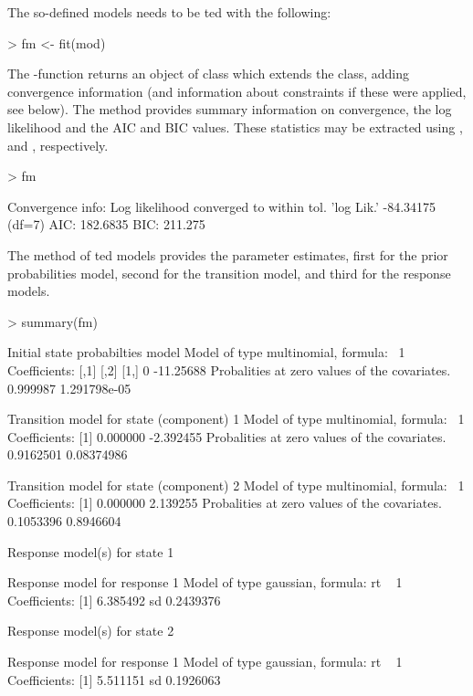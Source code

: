 \documentclass[article]{jss}
\begin{document}
The so-defined models needs to be ted with the following: 
\begin{CodeChunk}
\begin{CodeInput}
> fm <- fit(mod)
\end{CodeInput}
\end{CodeChunk}

The -function returns an object of class
 which extends the  class, adding
convergence information (and information about constraints if these
were applied, see below).  The  method provides summary
information on convergence, the log likelihood and the AIC and BIC
values.  These statistics may be extracted using ,
 and , respectively.

\begin{CodeChunk}
\begin{CodeInput}
> fm
\end{CodeInput}
\begin{CodeOutput}
Convergence info: Log likelihood converged to within tol. 
'log Lik.' -84.34175 (df=7)
AIC:  182.6835 
BIC:  211.275 
\end{CodeOutput}
\end{CodeChunk}

The  method of ted models provides the parameter
estimates, first for the prior probabilities model, second for the
transition model, and third for the response models.

\begin{CodeChunk}
\begin{CodeInput}
> summary(fm)
\end{CodeInput}
\begin{CodeOutput}
Initial state probabilties model 
Model of type multinomial, formula: ~1
Coefficients: 
     [,1]      [,2]
[1,]    0 -11.25688
Probalities at zero values of the covariates.
0.999987 1.291798e-05 

Transition model for state (component) 1 
Model of type multinomial, formula: ~1
Coefficients: 
[1]  0.000000 -2.392455
Probalities at zero values of the covariates.
0.9162501 0.08374986 

Transition model for state (component) 2 
Model of type multinomial, formula: ~1
Coefficients: 
[1] 0.000000 2.139255
Probalities at zero values of the covariates.
0.1053396 0.8946604 

Response model(s) for state 1 

Response model for response 1 
Model of type gaussian, formula: rt ~ 1
Coefficients: 
[1] 6.385492
sd  0.2439376 

Response model(s) for state 2 

Response model for response 1 
Model of type gaussian, formula: rt ~ 1
Coefficients: 
[1] 5.511151
sd  0.1926063 
\end{CodeOutput}
\end{CodeChunk}
\end{document}
